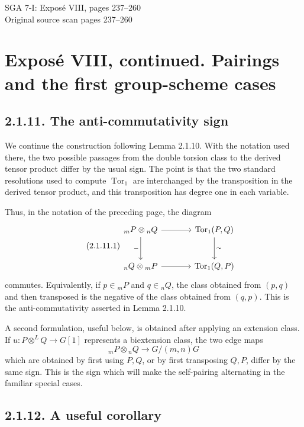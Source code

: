 \documentclass[11pt]{article}
\providecommand{\Tor}{\operatorname{Tor}}
\begin{document}
\begin{center}
{\Large SGA 7-I: Exposé VIII, pages 237--260}\\[0.35em]
{\large Original source scan pages 237--260}
\end{center}


\section*{Exposé VIII, continued. Pairings and the first group-scheme cases}

\subsection*{2.1.11. The anti-commutativity sign}

We continue the construction following Lemma 2.1.10.  With the notation used there, the two possible passages from the double torsion class to the derived tensor product differ by the usual sign.  The point is that the two standard resolutions used to compute \(\Tor_1\) are interchanged by the transposition in the derived tensor product, and this transposition has degree one in each variable.

Thus, in the notation of the preceding page, the diagram
\begin{equation}\tag{2.1.11.1}
\begin{tikzcd}[column sep=large,row sep=large]
 {}_mP\otimes {}_nQ \arrow[r] \arrow[d,"-"'] & \Tor_1(P,Q)\arrow[d,"\sim"]\\
 {}_nQ\otimes {}_mP \arrow[r] & \Tor_1(Q,P)
\end{tikzcd}
\end{equation}
commutes.  Equivalently, if \(p\in {}_mP\) and \(q\in {}_nQ\), the class obtained from \((p,q)\) and then transposed is the negative of the class obtained from \((q,p)\).  This is the anti-commutativity asserted in Lemma 2.1.10.

A second formulation, useful below, is obtained after applying an extension class.  If \(u:P\otimes^LQ\to G[1]\) represents a biextension class, the two edge maps
\[
        {}_mP\otimes {}_nQ\longrightarrow G/(m,n)G
\]
which are obtained by first using \(P,Q\), or by first transposing \(Q,P\), differ by the same sign.  This is the sign which will make the self-pairing alternating in the familiar special cases.

\subsection*{2.1.12. A useful corollary}
\end{document}
